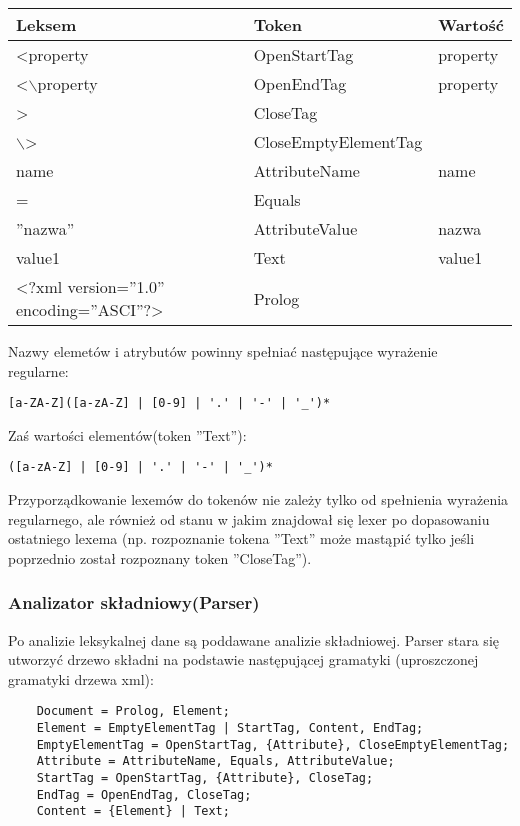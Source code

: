 \documentclass{article}
\begin{document}
\begin{center}
    \begin{tabular}{ | l | l | l |}
    \hline  
    Leksem & Token & Wartość \\ \hline 
    <property & OpenStartTag & property\\ \hline 
    <$\backslash$property & OpenEndTag & property\\ \hline 
    > & CloseTag &\\ \hline 
    $\backslash$> & CloseEmptyElementTag & \\ \hline 
    name & AttributeName & name \\ \hline
    = & Equals & \\ \hline
    ''nazwa'' & AttributeValue & nazwa \\ \hline
    value1 & Text & value1  \\ \hline
    <?xml version=''1.0'' encoding=''ASCI''?> & Prolog &  \\ \hline
    \end{tabular}
\end{center}

Nazwy elemetów i atrybutów powinny spełniać następujące wyrażenie\\
regularne:
\begin{verbatim}
[a-ZA-Z]([a-zA-Z] | [0-9] | '.' | '-' | '_')*
\end{verbatim} 
Zaś wartości elementów(token ''Text''):
\begin{verbatim}
([a-zA-Z] | [0-9] | '.' | '-' | '_')*
\end{verbatim}
Przyporządkowanie lexemów do tokenów nie zależy tylko od spełnienia wyrażenia regularnego, ale również od stanu w jakim znajdował się lexer po dopasowaniu ostatniego lexema
(np. rozpoznanie tokena ''Text'' może mastąpić tylko jeśli poprzednio został rozpoznany token ''CloseTag'').

\subsubsection{Analizator składniowy(Parser)}
Po analizie leksykalnej dane są poddawane analizie składniowej.
Parser stara się utworzyć drzewo składni na podstawie następującej gramatyki
(uproszczonej gramatyki drzewa xml):

\begin{verbatim} 
	Document = Prolog, Element;
	Element	= EmptyElementTag | StartTag, Content, EndTag;
	EmptyElementTag = OpenStartTag, {Attribute}, CloseEmptyElementTag;
	Attribute = AttributeName, Equals, AttributeValue;
	StartTag = OpenStartTag, {Attribute}, CloseTag;
	EndTag = OpenEndTag, CloseTag;
	Content	= {Element} | Text;
\end{verbatim}
	
\end{document}
